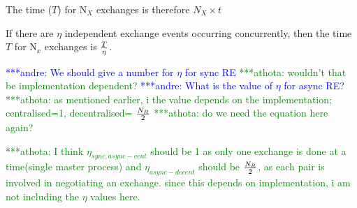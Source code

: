 \documentclass{rspublic}
\newcommand{\alnote}[1]{ {\textcolor{blue} { ***andre: #1 }}}
\newcommand{\athotanote}[1]{ {\textcolor{green} { ***athota: #1 }}}
\newcommand{\alnote}[1]{}
\newcommand{\athotanote}[1]{}
\begin{document}
The time ($T$) for N$_{X}$ exchanges is therefore $N_{X} \times t$

If there are $\eta$ independent exchange events occurring concurrently, then the time $T$ for 
N$_x$ exchanges is $T \over \eta$.

\alnote{We should give a number for $\eta$ for sync RE}\athotanote{wouldn't that be implementation dependent?}
\alnote{What is the value of $\eta$ for async RE?} \athotanote{as mentioned earlier, i the value depends on the implementation; centralised=1, decentralised= $N_R\over2$}
\athotanote{do we need the equation here again?}














\athotanote{I think $\eta_{sync,async-cent}$ should be 1 as only one exchange is done at a time(single master process) and $\eta_{async-decent}$ should be $N_R \over 2$, as each pair is involved in negotiating an exchange. since this depends on implementation, i am not including the $\eta$ values here.}

\end{document}
